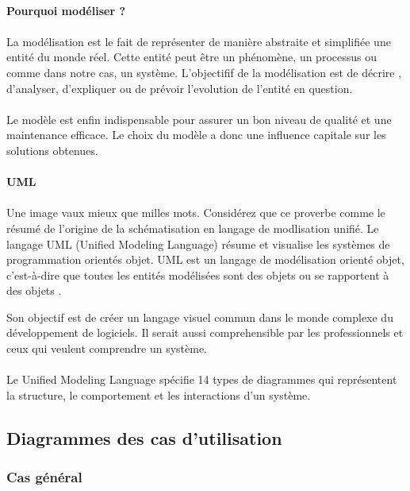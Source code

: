 
\paragraph{Pourquoi modéliser ?}
\paragraph{}
La modélisation est le fait de représenter de manière abstraite et simplifiée
une entité du monde réel. Cette entité peut être un phénomène, un processus ou 
comme dans notre cas, un système. L'objectifif de la modélisation est de décrire
, d'analyser, d'expliquer ou de prévoir l'evolution de l'entité en question.
\paragraph{}
Le modèle est enfin indispensable pour assurer un bon niveau de qualité 
et une maintenance efficace. Le choix du modèle a donc une influence capitale 
sur les solutions obtenues.
\paragraph{UML}
\paragraph{}
Une image vaux mieux que milles mots.
Considérez que ce proverbe comme le résumé de l'origine
de la schématisation en langage de modlisation unifié.
Le langage UML (Unified Modeling Language) résume et visualise les 
systèmes de programmation orientés objet. UML est un langage de 
modélisation orienté objet, c’est-à-dire que toutes 
les entités modélisées sont des objets ou se rapportent à des 
objets \cite{conan}.

Son objectif est de créer un langage visuel commun dans le monde 
complexe du développement de logiciels. Il serait aussi comprehensible
par les professionnels et ceux qui veulent comprendre un système. 
\paragraph{}
Le Unified Modeling Language spécifie 14 types de 
diagrammes qui représentent la structure, le comportement et les interactions d’un système.
\subsection{Diagrammes des cas d'utilisation}
    \subsubsection{Cas général}
